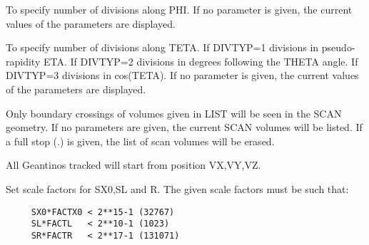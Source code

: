 \BEGARG
{}
\ENDARG

   \par
To specify number of divisions along PHI. If no parameter is given, the 
   current values of the parameters are displayed.  

\ENDCMD


\BEGARG
{}
\ENDARG

   \par
To specify number of divisions along TETA.  If DIVTYP=1 divisions in 
   pseudo-rapidity ETA.  If DIVTYP=2 divisions in degrees following the THETA 
   angle.  If DIVTYP=3 divisions in cos(TETA).  If no parameter is given, the 
   current values of the parameters are displayed.  

\ENDCMD


\BEGARG
{}
\ENDARG

   \par
Only boundary crossings of volumes given in LIST will be seen in the SCAN 
   geometry. If no parameters are given, the current SCAN volumes will be 
   listed. If a full stop (.) is given, the list of scan volumes will be 
   erased.  

\ENDCMD


\BEGARG
{}
\ENDARG

   \par
All Geantinos tracked will start from position VX,VY,VZ.  

\ENDCMD


\BEGARG
{}
\ENDARG

   \par
Set scale factors for SX0,SL and R. The given scale factors must be such 
   that:  
\begin{verbatim}
     SX0*FACTX0 < 2**15-1 (32767)
     SL*FACTL   < 2**10-1 (1023)
     SR*FACTR   < 2**17-1 (131071)
\end{verbatim}


